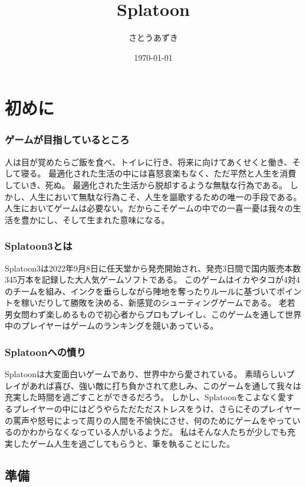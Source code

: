 \documentclass[a4paper,11pt]{jsbook}
\begin{document}
\title{Splatoon}
\author{さとうあずき}
\date{\today}
\maketitle
\tableofcontents

\part{初めに}
\section{ゲームが目指しているところ}
人は目が覚めたらご飯を食べ、トイレに行き、将来に向けてあくせくと働き、そして寝る。
最適化された生活の中には喜怒哀楽もなく、ただ平然と人生を消費していき、死ぬ。
最適化された生活から脱却するような無駄な行為である。
しかし、人生において無駄な行為こそ、人生を謳歌するための唯一の手段である。
人生においてゲームは必要ない。だからこそゲームの中での一喜一憂は我々の生活を豊かにし、そして生まれた意味になる。

\section{Splatoon3とは}
Splatoon3は2022年9月8日に任天堂から発売開始され、発売3日間で国内販売本数345万本を記録した大人気ゲームソフトである。
このゲームはイカやタコが4対4のチームを組み、インクを垂らしながら陣地を奪ったりルールに基づいてポイントを稼いだりして勝敗を決める、新感覚のシューティングゲームである。
老若男女問わず楽しめるもので初心者からプロもプレイし、このゲームを通して世界中のプレイヤーはゲームのランキングを競いあっている。

\section{Splatoonへの憤り}
Splatoonは大変面白いゲームであり、世界中から愛されている。
素晴らしいプレイがあれば喜び、強い敵に打ち負かされて悲しみ、このゲームを通して我々は充実した時間を過ごすことができるだろう。
しかし、Splatoonをこよなく愛するプレイヤーの中にはどうやらただただストレスをうけ、さらにそのプレイヤーの罵声や怒号によって周りの人間を不愉快にさせ、何のためにゲームをやっているのかわからなくなっている人がいるようだ。
私はそんな人たちが少しでも充実したゲーム人生を過ごしてもらうと、筆を執ることにした。

\chapter{準備}
\end{document}
